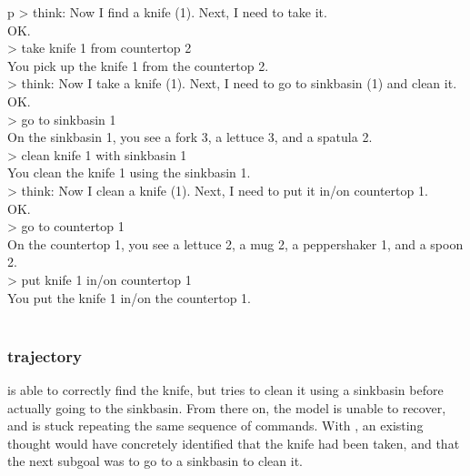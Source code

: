\begin{table}[H]
\begin{minipage}{0.9\linewidth}
\begin{tabular}{p\linewidth}
> think: Now I find a knife (1). Next, I need to take it. \\
OK. \\
> take knife 1 from countertop 2 \\
You pick up the knife 1 from the countertop 2. \\
> think: Now I take a knife (1). Next, I need to go to sinkbasin (1) and clean it. \\
OK. \\
> go to sinkbasin 1 \\
On the sinkbasin 1, you see a fork 3, a lettuce 3, and a spatula 2. \\
> clean knife 1 with sinkbasin 1 \\
You clean the knife 1 using the sinkbasin 1. \\
> think: Now I clean a knife (1). Next, I need to put it in/on countertop 1. \\
OK. \\
> go to countertop 1 \\
On the countertop 1, you see a lettuce 2, a mug 2, a peppershaker 1, and a spoon 2. \\
> put knife 1 in/on countertop 1 \\
You put the knife 1 in/on the countertop 1. \\
\midrule \\

\end{tabular}
\end{minipage}%
\end{table}

\subsubsection{\act{} trajectory}
\label{appendix:act_ALFWorld_trajectory}

\act{} is able to correctly find the knife, but tries to clean it using a sinkbasin before actually going to the sinkbasin. From there on, the model is unable to recover, and is stuck repeating the same sequence of commands. With \model{}, an existing thought would have concretely identified that the knife had been taken, and that the next subgoal was to go to a sinkbasin to clean it. 

